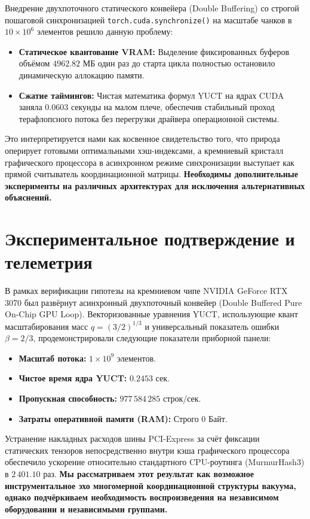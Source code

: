 \documentclass[11pt,a4paper]{article}
\begin{document}
	Внедрение двухпоточного статического конвейера (Double Buffering) со строгой пошаговой синхронизацией \texttt{torch.cuda.synchronize()} на масштабе чанков в $10 \times 10^6$ элементов решило данную проблему:
	\begin{itemize}
		\item \textbf{Статическое квантование VRAM:} Выделение фиксированных буферов объёмом $4962.82$ МБ один раз до старта цикла полностью остановило динамическую аллокацию памяти.
		\item \textbf{Сжатие таймингов:} Чистая математика формул YUCT на ядрах CUDA заняла $0.0603$ секунды на малом плече, обеспечив стабильный проход терафлопсного потока без перегрузки драйвера операционной системы.
	\end{itemize}
	Это интерпретируется нами как косвенное свидетельство того, что природа оперирует готовыми оптимальными хэш-индексами, а кремниевый кристалл графического процессора в асинхронном режиме синхронизации выступает как прямой считыватель координационной матрицы. \textbf{Необходимы дополнительные эксперименты на различных архитектурах для исключения альтернативных объяснений.}
	
	\section{Экспериментальное подтверждение и телеметрия}
	В рамках верификации гипотезы на кремниевом чипе NVIDIA GeForce RTX 3070 был развёрнут асинхронный двухпоточный конвейер (Double Buffered Pure On-Chip GPU Loop). Векторизованные уравнения YUCT, использующие квант масштабирования масс $q = (3/2)^{1/3}$ и универсальный показатель ошибки $\beta = 2/3$, продемонстрировали следующие показатели приборной панели:
	\begin{itemize}
		\item \textbf{Масштаб потока:} $1 \times 10^9$ элементов.
		\item \textbf{Чистое время ядра YUCT:} $0.2453$ сек.
		\item \textbf{Пропускная способность:} $977\,584\,285$ строк/сек.
		\item \textbf{Затраты оперативной памяти (RAM):} Строго $0$ Байт.
	\end{itemize}
	
	Устранение накладных расходов шины PCI-Express за счёт фиксации статических тензоров непосредственно внутри кэша графического процессора обеспечило ускорение относительно стандартного CPU-роутинга (MurmurHash3) в $2\,401.10$ раз. \textbf{Мы рассматриваем этот результат как возможное инструментальное эхо многомерной координационной структуры вакуума, однако подчёркиваем необходимость воспроизведения на независимом оборудовании и независимыми группами.}
	
\end{document}
